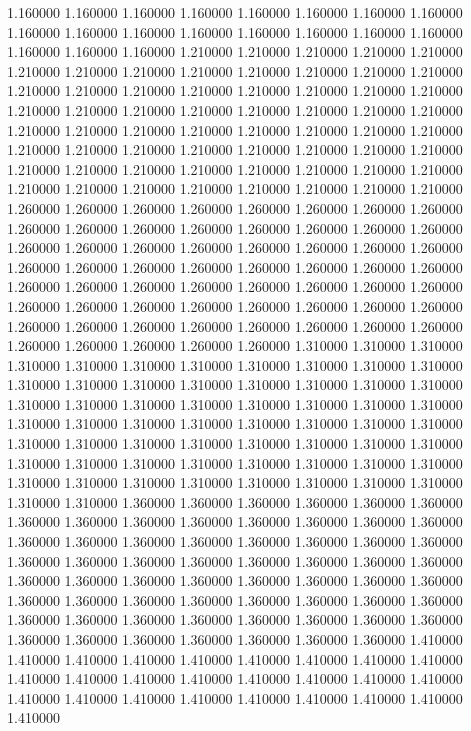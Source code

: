 1.160000
1.160000
1.160000
1.160000
1.160000
1.160000
1.160000
1.160000
1.160000
1.160000
1.160000
1.160000
1.160000
1.160000
1.160000
1.160000
1.160000
1.160000
1.160000
1.210000
1.210000
1.210000
1.210000
1.210000
1.210000
1.210000
1.210000
1.210000
1.210000
1.210000
1.210000
1.210000
1.210000
1.210000
1.210000
1.210000
1.210000
1.210000
1.210000
1.210000
1.210000
1.210000
1.210000
1.210000
1.210000
1.210000
1.210000
1.210000
1.210000
1.210000
1.210000
1.210000
1.210000
1.210000
1.210000
1.210000
1.210000
1.210000
1.210000
1.210000
1.210000
1.210000
1.210000
1.210000
1.210000
1.210000
1.210000
1.210000
1.210000
1.210000
1.210000
1.210000
1.210000
1.210000
1.210000
1.210000
1.210000
1.210000
1.210000
1.210000
1.260000
1.260000
1.260000
1.260000
1.260000
1.260000
1.260000
1.260000
1.260000
1.260000
1.260000
1.260000
1.260000
1.260000
1.260000
1.260000
1.260000
1.260000
1.260000
1.260000
1.260000
1.260000
1.260000
1.260000
1.260000
1.260000
1.260000
1.260000
1.260000
1.260000
1.260000
1.260000
1.260000
1.260000
1.260000
1.260000
1.260000
1.260000
1.260000
1.260000
1.260000
1.260000
1.260000
1.260000
1.260000
1.260000
1.260000
1.260000
1.260000
1.260000
1.260000
1.260000
1.260000
1.260000
1.260000
1.260000
1.260000
1.260000
1.260000
1.260000
1.260000
1.310000
1.310000
1.310000
1.310000
1.310000
1.310000
1.310000
1.310000
1.310000
1.310000
1.310000
1.310000
1.310000
1.310000
1.310000
1.310000
1.310000
1.310000
1.310000
1.310000
1.310000
1.310000
1.310000
1.310000
1.310000
1.310000
1.310000
1.310000
1.310000
1.310000
1.310000
1.310000
1.310000
1.310000
1.310000
1.310000
1.310000
1.310000
1.310000
1.310000
1.310000
1.310000
1.310000
1.310000
1.310000
1.310000
1.310000
1.310000
1.310000
1.310000
1.310000
1.310000
1.310000
1.310000
1.310000
1.310000
1.310000
1.310000
1.310000
1.310000
1.310000
1.360000
1.360000
1.360000
1.360000
1.360000
1.360000
1.360000
1.360000
1.360000
1.360000
1.360000
1.360000
1.360000
1.360000
1.360000
1.360000
1.360000
1.360000
1.360000
1.360000
1.360000
1.360000
1.360000
1.360000
1.360000
1.360000
1.360000
1.360000
1.360000
1.360000
1.360000
1.360000
1.360000
1.360000
1.360000
1.360000
1.360000
1.360000
1.360000
1.360000
1.360000
1.360000
1.360000
1.360000
1.360000
1.360000
1.360000
1.360000
1.360000
1.360000
1.360000
1.360000
1.360000
1.360000
1.360000
1.360000
1.360000
1.360000
1.360000
1.360000
1.360000
1.410000
1.410000
1.410000
1.410000
1.410000
1.410000
1.410000
1.410000
1.410000
1.410000
1.410000
1.410000
1.410000
1.410000
1.410000
1.410000
1.410000
1.410000
1.410000
1.410000
1.410000
1.410000
1.410000
1.410000
1.410000
1.410000
